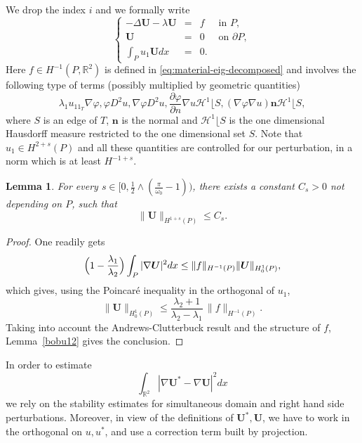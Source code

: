 \documentclass[JEP,XML,SOM,Unicode,ThmDefs,NoFloatCountersInSection,published]{cedram}
\theoremstyle{plain}
\newtheorem{lemma}[thm]{Lemma}
\theoremstyle{definition}
\newcommand{\bo}[1]{{\boldsymbol#1}}
\let\Bbb\mathbb
\def\R{\mathbb{R}}
\newcommand{\vphi}{\varphi}
\newcommand{\lb}{\lambda}
\begin{document}
We drop the index $i$ and we formally write
\begin{equation}\label{bobu28}
\left\{ \begin{array}{rcll}
-\Delta \bo U - \lb \bo U& =& f& \text{ in }P,\\
\bo U&= &0 & \text{ on }\partial P,\\
\int_P u_1 \bo U dx&= &0.
\end{array} \right.
\end{equation}
Here $f \in H^{-1} (P, \R^2)$ is defined in \eqref{eq:material-eig-decomposed} and involves the following type of terms (possibly multiplied by geometric quantities)
\[
\lb_1 u_11_T \nabla \vphi, \vphi D^2 u, \nabla \vphi D^2 u, \frac{ \partial \varphi }{\partial n} \nabla u {\mathcal H^1}\lfloor S, (\nabla \varphi \nabla u) \bo n {\mathcal H^1}\lfloor S,
\]
where $S$ is an edge of $T$, $\bo n$ is the normal and ${\mathcal H^1}\lfloor S$ is the one dimensional Hausdorff measure restricted to the one dimensional set $S$. Note that $u_1 \in H^{2+s} (P)$ and all these quantities are controlled for our perturbation, in a norm which is at least $H^{-1+s}$.
\begin{lemma} \label{bobu27}
For every $s \in \bigl[0, \frac 12\wedge (\frac{\pi}{\omega_0}-1)\bigr)$, there exists a constant $C_s>0$ not depending on $P$, such that
\[
\|\bo U\|_{H^{1+s} (P)} \le C_s.
\]
\end{lemma}
\begin{proof}
One readily gets
\[
\Bigl(1 -\frac{\lb_1}{\lb_2} \Bigr) \int _P |\nabla \bo U |^2 dx \le \|f\|_{H^{-1}(P)} \| \bo U \|_{H^1_0(P)},
\]
which gives, using the Poincaré inequality in the orthogonal of $u_1$,
\[
\| \bo U \|_{H^1_0(P)} \le \frac{\lb_2+1}{\lb_2-\lb_1}\,\|f\|_{H^{-1}(P)}.
\]
Taking into account the Andrews-Clutterbuck result \cite{AnCl11} and the structure of $f$, Lemma~\ref{bobu12} gives the conclusion.
\end{proof}

In order to estimate
\[
\int_{ {\Bbb{R}^2}} |\nabla \bo U^* - \nabla\bo U |^2 dx
\]
we rely on the stability estimates for simultaneous domain and right hand side perturbations. Moreover, in view of the definitions of $\bo U^*, \bo U$, we have to work in the orthogonal on $u, u^*$, and use a correction term built by projection.
\end{document}
